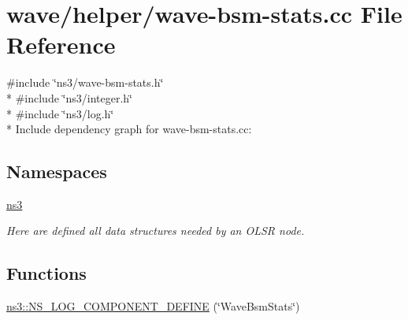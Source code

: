 \hypertarget{wave-bsm-stats_8cc}{}\section{wave/helper/wave-\/bsm-\/stats.cc File Reference}
\label{wave-bsm-stats_8cc}
{\ttfamily \#include \char`\"{}ns3/wave-\/bsm-\/stats.\+h\char`\"{}}\\*
{\ttfamily \#include \char`\"{}ns3/integer.\+h\char`\"{}}\\*
{\ttfamily \#include \char`\"{}ns3/log.\+h\char`\"{}}\\*
Include dependency graph for wave-\/bsm-\/stats.cc\+:
\subsection*{Namespaces}
\begin{DoxyCompactItemize}
\item 
 \hyperlink{namespacens3}{ns3}
\begin{DoxyCompactList}\small\item\em Here are defined all data structures needed by an O\+L\+SR node. \end{DoxyCompactList}\end{DoxyCompactItemize}
\subsection*{Functions}
\begin{DoxyCompactItemize}
\item 
\hyperlink{namespacens3_a7c9be76b0bf2b8493c1fc8ef548edc19}{ns3\+::\+N\+S\+\_\+\+L\+O\+G\+\_\+\+C\+O\+M\+P\+O\+N\+E\+N\+T\+\_\+\+D\+E\+F\+I\+NE} (\char`\"{}Wave\+Bsm\+Stats\char`\"{})
\end{DoxyCompactItemize}
